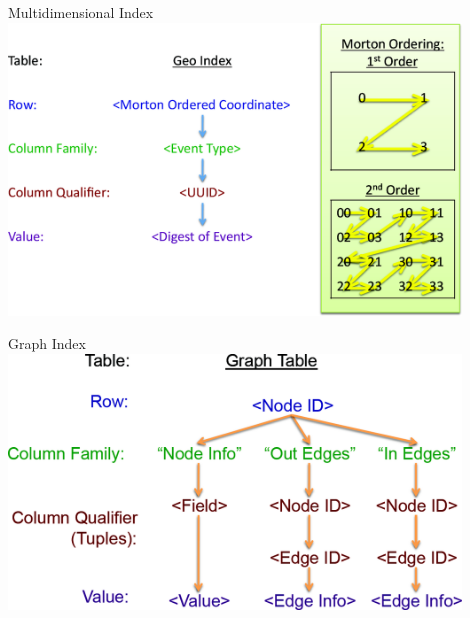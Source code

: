 \documentclass[t,landscape]{beamer}
\begin{document}
\begin{frame}{Multidimensional Index}
\includegraphics[width=0.9\textwidth]{images/geo_pattern.png}
\end{frame}

\begin{frame}{Graph Index}
\includegraphics[width=0.9\textwidth]{images/graph_pattern2.png}
\end{frame}
\end{document}
